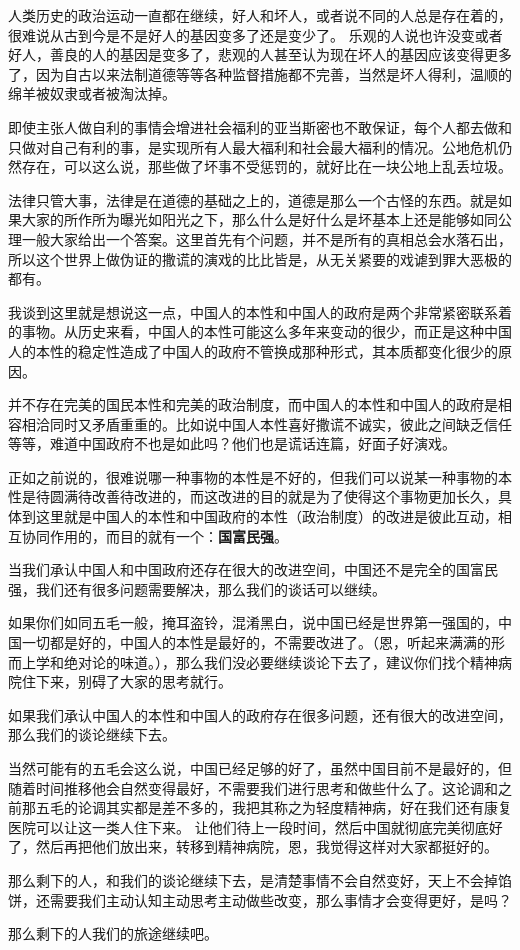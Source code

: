 \documentclass[12pt,oneside]{book}
\begin{document}
\begin{common-format}
人类历史的政治运动一直都在继续，好人和坏人，或者说不同的人总是存在着的，很难说从古到今是不是好人的基因变多了还是变少了。 乐观的人说也许没变或者好人，善良的人的基因是变多了，悲观的人甚至认为现在坏人的基因应该变得更多了，因为自古以来法制道德等等各种监督措施都不完善，当然是坏人得利，温顺的绵羊被奴隶或者被淘汰掉。

即使主张人做自利的事情会增进社会福利的亚当斯密也不敢保证，每个人都去做和只做对自己有利的事，是实现所有人最大福利和社会最大福利的情况。公地危机仍然存在，可以这么说，那些做了坏事不受惩罚的，就好比在一块公地上乱丢垃圾。

法律只管大事，法律是在道德的基础之上的，道德是那么一个古怪的东西。就是如果大家的所作所为曝光如阳光之下，那么什么是好什么是坏基本上还是能够如同公理一般大家给出一个答案。这里首先有个问题，并不是所有的真相总会水落石出，所以这个世界上做伪证的撒谎的演戏的比比皆是，从无关紧要的戏谑到罪大恶极的都有。

我谈到这里就是想说这一点，中国人的本性和中国人的政府是两个非常紧密联系着的事物。从历史来看，中国人的本性可能这么多年来变动的很少，而正是这种中国人的本性的稳定性造成了中国人的政府不管换成那种形式，其本质都变化很少的原因。

并不存在完美的国民本性和完美的政治制度，而中国人的本性和中国人的政府是相容相洽同时又矛盾重重的。比如说中国人本性喜好撒谎不诚实，彼此之间缺乏信任等等，难道中国政府不也是如此吗？他们也是谎话连篇，好面子好演戏。

正如之前说的，很难说哪一种事物的本性是不好的，但我们可以说某一种事物的本性是待圆满待改善待改进的，而这改进的目的就是为了使得这个事物更加长久，具体到这里就是中国人的本性和中国政府的本性（政治制度）的改进是彼此互动，相互协同作用的，而目的就有一个：\textbf{国富民强}。﻿

当我们承认中国人和中国政府还存在很大的改进空间，中国还不是完全的国富民强，我们还有很多问题需要解决，那么我们的谈话可以继续。

如果你们如同五毛一般，掩耳盗铃，混淆黑白，说中国已经是世界第一强国的，中国一切都是好的，中国人的本性是最好的，不需要改进了。（恩，听起来满满的形而上学和绝对论的味道。），那么我们没必要继续谈论下去了，建议你们找个精神病院住下来，别碍了大家的思考就行。

如果我们承认中国人的本性和中国人的政府存在很多问题，还有很大的改进空间，那么我们的谈论继续下去。

当然可能有的五毛会这么说，中国已经足够的好了，虽然中国目前不是最好的，但随着时间推移他会自然变得最好，不需要我们进行思考和做些什么了。这论调和之前那五毛的论调其实都是差不多的，我把其称之为轻度精神病，好在我们还有康复医院可以让这一类人住下来。 让他们待上一段时间，然后中国就彻底完美彻底好了，然后再把他们放出来，转移到精神病院，恩，我觉得这样对大家都挺好的。

那么剩下的人，和我们的谈论继续下去，是清楚事情不会自然变好，天上不会掉馅饼，还需要我们主动认知主动思考主动做些改变，那么事情才会变得更好，是吗？

那么剩下的人我们的旅途继续吧。﻿

\end{common-format}
\end{document}
